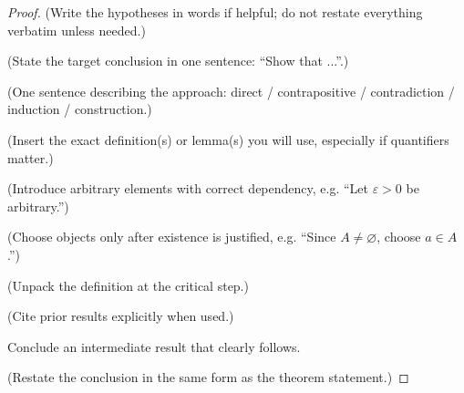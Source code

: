 \begin{proof}
\Given (Write the hypotheses in words if helpful; do not restate everything verbatim unless needed.)

\Goal (State the target conclusion in one sentence: ``Show that ...''.)

\Strategy (One sentence describing the approach: direct / contrapositive / contradiction / induction / construction.)

\Recall (Insert the exact definition(s) or lemma(s) you will use, especially if quantifiers matter.)


\Let (Introduce arbitrary elements with correct dependency, e.g. ``Let $\varepsilon>0$ be arbitrary.'')

\Choose (Choose objects only after existence is justified, e.g. ``Since $A\neq\varnothing$, choose $a\in A$.'')

\ByDef (Unpack the definition at the critical step.)

 (Cite prior results explicitly when used.)

\Therefore Conclude an intermediate result that clearly follows.

\Hence (Restate the conclusion in the same form as the theorem statement.)
\AsReq
\end{proof}



